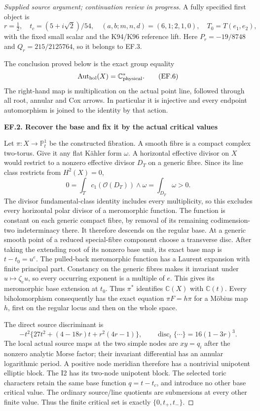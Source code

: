 \begin{proof}[Supplied source argument; continuation review in progress]
A fully specified first object is
\[
 r=\tfrac12,\quad t_c=(5+i\sqrt2)/54,\quad
 (a,b;m,n,d)=(6,1;2,1,0),\quad T_0=T(e_1,e_2),
 \tag{EF.5}
\]
with the fixed small scalar and the K94/K96 reference lift. Here
\(P_r=-19/8748\) and \(Q_r=215/2125764\), so it belongs to EF.3.

The conclusion proved below is the exact group equality
\[
       \operatorname{Aut}_{\rm hol}(X)=\mathbb C^*_{\rm physical}.
 \tag{EF.6}
\]
The right-hand map is multiplication on the actual point line, followed
through all root, annular and Cox arrows. In particular it is injective
and every endpoint automorphism is joined to the identity by that action.

\par

\medskip\noindent\textbf{EF.2. Recover the base and fix it by the actual critical values}

\par\nobreak

Let \(\pi:X\to\mathbb P^1_t\) be the constructed fibration. A smooth
fibre is a compact complex two-torus. Give it any flat Kähler form
\(\omega\). A horizontal effective divisor on \(X\) would restrict
to a nonzero effective divisor \(D_T\) on a generic fibre. Since its
line class restricts from \(H^2(X)=0\),
\[
 0=\int_T c_1(\mathcal O(D_T))\wedge\omega
   =\int_{D_T}\omega>0.
 \tag{EF.7}
\]
The divisor fundamental-class identity includes every multiplicity, so
this excludes every horizontal polar divisor of a meromorphic function.
The function is constant on each generic compact fibre, by removal of
its remaining codimension-two indeterminacy there. It therefore descends
on the regular base. At a generic smooth point of a reduced special-fibre
component choose a transverse disc. After taking the extending root of
its nonzero base unit, its exact base map is \(t-t_0=u^e\).
The pulled-back meromorphic function has a Laurent expansion with finite
principal part. Constancy on the generic fibres makes it invariant under
\(u\mapsto\zeta_eu\), so every occurring exponent is a multiple of
\(e\). This gives its meromorphic base extension at \(t_0\). Thus
\(\pi^*\) identifies \(\mathbb C(X)\) with \(\mathbb C(t)\).
Every biholomorphism consequently has the exact equation
\(\pi F=h\pi\) for a Möbius map \(h\), first on the regular locus
and then on the whole space.

The direct source discriminant is
\[
 -t^2\{27t^2+(4-18r)t+r^2(4r-1)\},
 \qquad \operatorname{disc}_t\{\cdots\}=16(1-3r)^3.
 \tag{EF.8}
\]
The local actual source maps at the two simple nodes are \(xy=q_i\)
after the nonzero analytic Morse factor; their invariant differential
has an annular logarithmic period. A positive node meridian therefore
has a nontrivial unipotent elliptic block. The I2 has its two-node
unipotent block. The selected toric characters retain the same base
function \(q=t-t_c\), and introduce no other base critical value.
The ordinary source/line quotients are submersions at every other finite
value. Thus the finite critical set is exactly \(\{0,t_+,t_-\}\).


\end{proof}
